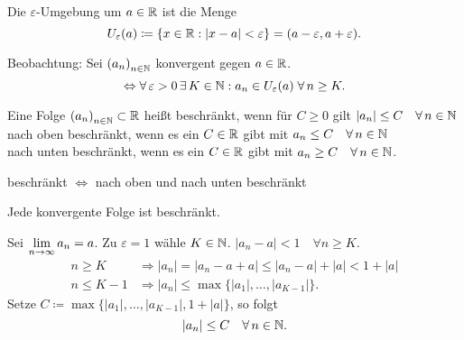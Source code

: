 \documentclass[../ana1.tex]{subfiles}
\begin{document}
\begin{defi}
	Die \(\varepsilon \)-Umgebung um \(a\in\mathbb{R} \) ist die Menge
	\[U_\varepsilon(a)\coloneqq \{x\in\mathbb{R}: |x-a| <\varepsilon \} = (a-\varepsilon, a+\varepsilon).\]
\end{defi}

Beobachtung: Sei \({(a_n)}_{n\in\mathbb{N}}\) konvergent gegen \(a\in\mathbb{R} \).
\[\Leftrightarrow \forall \varepsilon >0 \,\exists K\in\N: a_n \in U_\varepsilon(a) \;\forall n\geq K.\]

\begin{defi}
	Eine Folge \({(a_n)}_{n\in\mathbb{N}} \subset \mathbb{R} \) heißt beschränkt, wenn für \(C\geq 0\) gilt \(|a_n|\leq C \quad \forall n\in\N \) \\
	nach oben beschränkt, wenn es ein \(C\in\mathbb{R} \) gibt mit \(a_n\leq C \quad \forall n\in\N \) \\
	nach unten beschränkt, wenn es ein \(C\in\mathbb{R} \) gibt mit \(a_n\geq C \quad \forall n\in\N \).
\end{defi}

\begin{bem}
	beschränkt \(\Leftrightarrow \) nach oben und nach unten beschränkt
\end{bem}

\begin{satz}
	Jede konvergente Folge ist beschränkt.
\end{satz}
\begin{bew}
	Sei \(\lim\limits_{n\rightarrow\infty} a_n = a\). Zu \(\varepsilon = 1\) wähle \(K\in\mathbb{N} \).
	\(|a_n-a|<1 \quad \forall n\geq K\).
	\begin{align*}
		n\geq K &\Rightarrow |a_n| = |a_n -a+a| \leq |a_n -a| + |a| < 1 + |a|\\
		n\leq K-1 &\Rightarrow |a_n| \leq \max \{|a_1|,\ldots,|a_{K-1}|\}.
	\end{align*}
	Setze \(C\coloneqq \max \{|a_1|,\ldots,|a_{K-1}|, 1 + |a|\} \), so folgt
	\[|a_n| \leq C \quad\forall n\in\N.\]
\end{bew}
\end{document}
